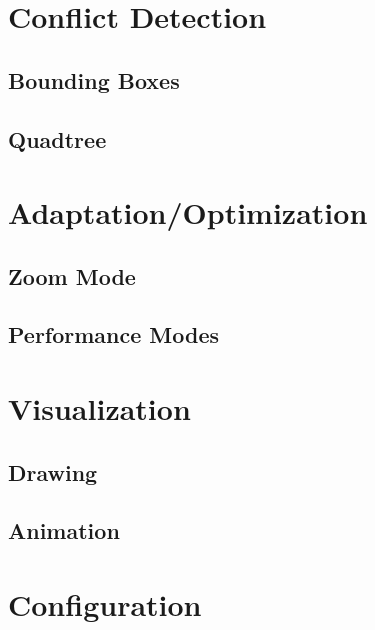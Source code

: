 \documentclass[final,nopreprintline]{elsarticle}
\begin{document}
\section{Conflict Detection}
\label{sec:conflict}

\subsection{Bounding Boxes}
\label{subsec:bbox}
    

\subsection{Quadtree}
\label{subsec:quadtree}
    


\section{Adaptation/Optimization}
\label{sec:adaptation}

\subsection{Zoom Mode}
\label{subsec:zoom}
    

\subsection{Performance Modes}
\label{subsec:perf}
    


\section{Visualization}
\label{sec:visualization}

\subsection{Drawing}
\label{subsec:draw}
    

\subsection{Animation}
\label{subsec:animate}
    


\section{Configuration}
\label{sec:configuration}
\end{document}
